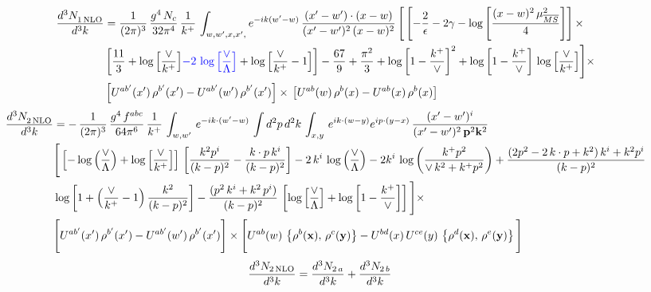 \documentclass[9pt]{article}
\numberwithin{equation}{section}
\begin{document}
\begin{align}
     \frac{d^{3}N_{1\,\rm NLO}^{\rm}}{d^{3}k} &  = \frac{1}{(2\pi)^{3}}\, \frac{g^{4}\,N_{c}}{32\pi^{4}}\,\frac{1}{k^{+}}\, \int_{w, w',x,x',} e^{-ik(w^\prime-w)}\, \frac{(x'-w')\cdot (x-w)}{(x'-w')^{2}\, (x-w)^{2}}\, \Bigg[\left[-\frac{2}{\epsilon}-2\gamma-\log{\left[\frac{(x-w)^{2}\,\mu^{2}_{\overline{MS}}}{4}\right]}\right]\times \notag \\ & \left[\frac{11}{3}+\log{\left[\frac{\vee}{k^{+}}\right]}{\color{blue}-2\,\log{\left[\frac{\vee}{\Lambda}\right]}}+\log{\left[\frac{\vee}{k^{+}}-1\right]}\right]-\frac{67}{9}+\frac{\pi^{2}}{3}+\log{\left[1-\frac{k^{+}}{\vee}\right]^{2}}+\log{\left[1-\frac{k^{+}}{\vee}\right]}\,\log{\left[\frac{\vee}{k^{+}}\right]}\Bigg]\times\notag \\ & \left[U^{ab'}(x')\,\rho^{b'}(x') - U^{ab'}(w')\,\rho^{b'}(x')\right]\times\,\left[U^{ab}(w)\,\rho^{b}(x) - U^{ab}(x)\,\rho^{b}(x)\right]
\end{align}
\begin{align}
   \frac{d^{3}N_{2\,\rm NLO}^{\rm}}{d^{3}k} &  = -\,\frac{1}{(2\pi)^{3}}\,\frac{g^{4}\,f^{abc}}{64\pi^{6}}\, \frac{1}{k^{+}}\,\int_{w,w'}\, e^{-ik\cdot (w'-w)}\,\int d^{2}p\,d^{2}k\,\int_{x,y}\, e^{ik\cdot (w-y)} e^{ip\cdot (y-x)}\, \frac{(x'-w')^{i}}{(x'-w')^{2}\,\mathbf{p}^{2}\mathbf{k}^{2} }\notag \\ & \Bigg[\left[-\log{\left(\frac{\vee}{\Lambda}\right)}+\log{\left[\frac{\vee}{k^{+}}\right]}\right]\,\left[\frac{k^{2}p^{i}}{(k-p)^{2}}-\frac{k\cdot p\,k^{i}}{(k-p)^{2}}\right]-2\,k^{i}\,\log{\left(\frac{\vee}{\Lambda}\right)} -2k^{i}\,\log{\left(\frac{k^{+}p^{2}}{\vee\, k^{2}+k^{+}p^{2}}\right)}+\frac{(2p^{2}-2\,k\cdot p + k^{2})\,k^{i} + k^{2}p^{i}}{(k-p)^{2}}\notag \\ &  \log{\left[1+\left(\frac{\vee}{k^{+}}-1\right)\frac{k^{2}}{(k-p)^{2}}\right]} - \frac{(p^{2}\,k^{i}+k^{2}\,p^{i})}{(k-p)^{2}}\,\left[\log{\left[\frac{\vee}{\Lambda}\right]}+\log{\left[1-\frac{k^{+}}{\vee}\right]}\right]\Bigg]\times\,\notag \\ &  \Bigg[U^{ab'}(x')\,\rho^{b'}(x') - U^{ab'}(w')\,\rho^{b'}(x')\Bigg]\times\Bigg[U^{ab}(w)\,\left\{ \rho^{b}(\mathbf{x}),\,\rho^{c}(\mathbf{y})\right\}-U^{bd}(x)\, U^{ce}(y)\, \left\{\rho^{d}(\mathbf{x}),\,\rho^{e}(\mathbf{y})\right\}\Bigg]
\end{align}
\begin{align}
\frac{d^{3}N_{2\,\rm NLO}}{d^{3}k} &= \frac{d^{3}N_{2\,a}}{d^{3}k} + \frac{d^{3}N_{2\,b}}{d^{3}k}
\end{align}
\end{document}
